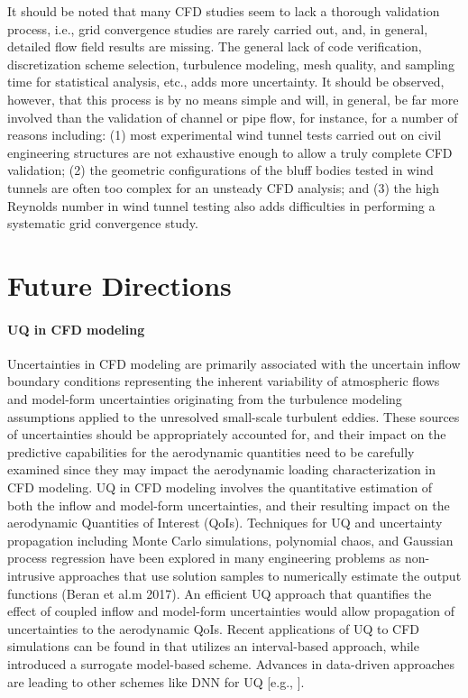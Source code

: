 It should be noted that many CFD studies seem to lack a thorough validation process, i.e., grid convergence studies are rarely carried out, and, in general, detailed flow field results are missing. The general lack of code verification, discretization scheme selection, turbulence modeling, mesh quality, and sampling time for statistical analysis, etc., adds more uncertainty. It should be observed, however, that this process is by no means simple and will, in general, be far more involved than the validation of channel or pipe flow, for instance, for a number of reasons including: (1) most experimental wind tunnel tests carried out on civil engineering structures are not exhaustive enough to allow a truly complete CFD validation; (2) the geometric configurations of the bluff bodies tested in wind tunnels are often too complex for an unsteady CFD analysis; and (3) the high Reynolds number in wind tunnel testing also adds difficulties in performing a systematic grid convergence study.

\section{Future Directions}
\label{sec:resp_cfd_wind_flow_modeling}

\paragraph{UQ in CFD modeling} Uncertainties in CFD modeling are primarily associated with the uncertain inflow boundary conditions representing the inherent variability of atmospheric flows and model-form uncertainties originating from the turbulence modeling assumptions applied to the unresolved small-scale turbulent eddies. These sources of uncertainties should be appropriately accounted for, and their impact on the predictive capabilities for the aerodynamic quantities need to be carefully examined since they may impact the aerodynamic loading characterization in CFD modeling. UQ in CFD modeling involves the quantitative estimation of both the inflow and model-form uncertainties, and their resulting impact on the aerodynamic Quantities of Interest (QoIs). Techniques for UQ and uncertainty propagation including Monte Carlo simulations, polynomial chaos, and Gaussian process regression have been explored in many engineering problems as non-intrusive approaches that use solution samples to numerically estimate the output functions (Beran et al.m 2017). An efficient UQ approach that quantifies the effect of coupled inflow and model-form uncertainties would allow propagation of uncertainties to the aerodynamic QoIs. Recent applications of UQ to CFD simulations can be found in \citep{gorle2015quantifying} that utilizes an interval-based approach, while \citep{ding2019inflow} introduced a surrogate model-based scheme. Advances in data-driven approaches are leading to other schemes like DNN for UQ [e.g., \citep{ling2016reynolds, luo2019deep}].

